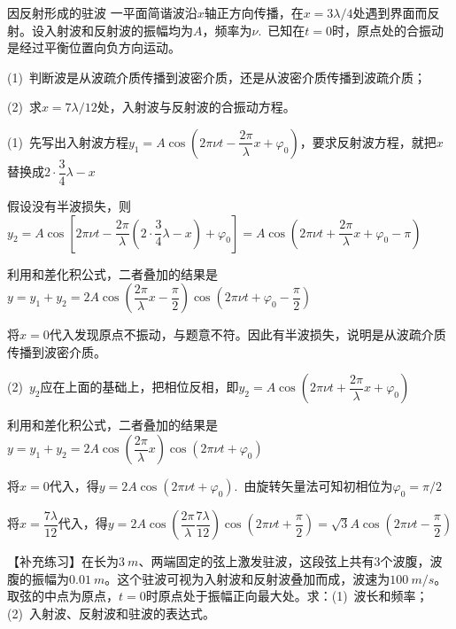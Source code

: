 \begin{example}{因反射形成的驻波}
    一平面简谐波沿$x$轴正方向传播，在$x=3\lambda /4$处遇到界面而反射。设入射波和反射波的振幅均为$A$，频率为$\nu$.~已知在$t=0$时，原点处的合振动是经过平衡位置向负方向运动。
    
    (1)~判断波是从波疏介质传播到波密介质，还是从波密介质传播到波疏介质；
    
    (2)~求$x=7\lambda/12$处，入射波与反射波的合振动方程。

    \tcblower

    (1)~先写出入射波方程$y_1=A\cos{(2\pi \nu t-\dfrac{2\pi}{\lambda}x+\varphi_0)}$，要求反射波方程，就把$x$替换成$2\cdot \dfrac{3}{4}\lambda-x$

    \vspace{0.5em}
    
    假设没有半波损失，则$y_2=A\cos{[2\pi \nu t-\dfrac{2\pi}{\lambda}(2\cdot \dfrac{3}{4}\lambda-x)+\varphi_0]}=A\cos{(2\pi \nu t+\dfrac{2\pi}{\lambda}x+\varphi_0-\pi)}$

    \vspace{0.5em}

    利用和差化积公式，二者叠加的结果是$y=y_1+y_2=2A\cos{(\dfrac{2\pi}{\lambda}x-\dfrac{\pi}{2})}\cos{(2\pi\nu t+\varphi_0-\dfrac{\pi}{2})}$

    \vspace{0.5em}

    将$x=0$代入发现原点不振动，与题意不符。因此有半波损失，说明是从波疏介质传播到波密介质。

    \vspace{0.5em}

    (2)~$y_2$应在上面的基础上，把相位反相，即$y_2=A\cos{(2\pi \nu t+\dfrac{2\pi}{\lambda}x+\varphi_0)}$

    \vspace{0.5em}

    利用和差化积公式，二者叠加的结果是$y=y_1+y_2=2A\cos{(\dfrac{2\pi}{\lambda}x)}\cos{(2\pi\nu t+\varphi_0)}$

    \vspace{0.5em}

    将$x=0$代入，得$y=2A\cos{(2\pi\nu t+\varphi_0)}$.~由旋转矢量法可知初相位为$\varphi_0=\pi/2$

    \vspace{0.5em}

    将$x=\dfrac{7\lambda}{12}$代入，得$y=2A\cos{(\dfrac{2\pi}{\lambda}\dfrac{7\lambda}{12})}\cos{(2\pi\nu t+\dfrac{\pi}{2})}=\sqrt{3}A\cos{(2\pi\nu t-\dfrac{\pi}{2})}$
    
    \tcbline

    【补充练习】在长为$\SI{3}{m}$、两端固定的弦上激发驻波，这段弦上共有3个波腹，波腹的振幅为$\SI{0.01}{m}$。这个驻波可视为入射波和反射波叠加而成，波速为$\SI{100}{m/s}$。取弦的中点为原点，$t=0$时原点处于振幅正向最大处。求：(1)~波长和频率；(2)~入射波、反射波和驻波的表达式。
\end{example}

